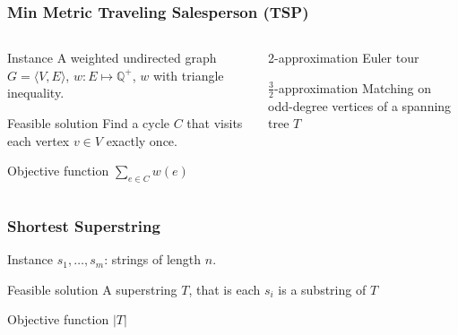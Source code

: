 \documentclass[12pt,aspectratio=169]{beamer}
\begin{document}
\begin{frame}\frametitle{Min Metric Traveling Salesperson (TSP)}
\begin{columns} 
  \begin{column}{0.48\textwidth}
  \begin{block}{Instance}
    A weighted undirected graph $G=\langle V,E \rangle$, $w:E\mapsto \mathbb{Q}^{+}$, $w$
    with triangle inequality.
  \end{block}
  \begin{block}{Feasible solution}
    Find a cycle $C$ that visits each vertex  $v\in V$ exactly once.
%
  \end{block}
  \begin{block}{Objective function}
    $\sum_{e\in C}w(e)$
  \end{block}
\end{column}
    \begin{column}{0.48\textwidth}
      \begin{block}{2-approximation}
        Euler tour
      \end{block}
      \begin{block}{$\frac{3}{2}$-approximation}
Matching on odd-degree vertices of a spanning tree $T$
      \end{block}
    \end{column}
\end{columns}
\end{frame}

  \begin{frame}\frametitle{Shortest Superstring }
  \begin{block}{Instance}
      $s_{1}, \ldots, s_{m}$: strings of length $n$.
  \end{block}
  \begin{block}{Feasible solution}
    A superstring $T$, that is each $s_{i}$ is a substring of $T$
%
  \end{block}
  \begin{block}{Objective function}
    $|T|$
  \end{block}
\end{frame} 
\end{document}
